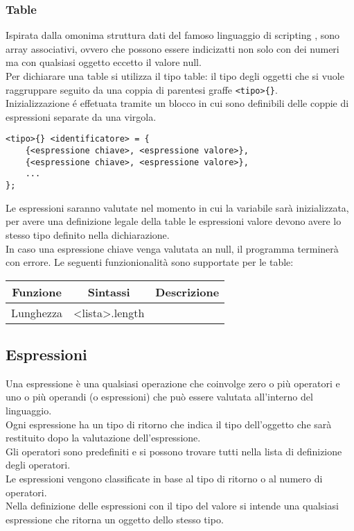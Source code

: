 \subsubsection{Table}
Ispirata dalla omonima struttura dati del famoso linguaggio di scripting \cite{LUA},
sono array associativi, ovvero che possono essere indicizatti non solo con dei 
numeri ma con qualsiasi oggetto eccetto il valore null. \\
Per dichiarare una table si utilizza il tipo table:
il tipo degli oggetti che si vuole raggruppare seguito da una coppia di parentesi 
graffe \verb|<tipo>{}|. \\
Inizializzazione é effetuata tramite un blocco in cui sono definibili delle coppie
di espressioni separate da una virgola.
\begin{lstlisting}
<tipo>{} <identificatore> = {
    {<espressione chiave>, <espressione valore>},
    {<espressione chiave>, <espressione valore>},
    ...
};
\end{lstlisting}
Le espressioni saranno valutate nel momento in cui la variabile sarà inizializzata,
per avere una definizione legale della table le espressioni valore devono avere 
lo stesso tipo definito nella dichiarazione. \\
In caso una espressione chiave venga valutata an null, il programma terminerà con errore.
Le seguenti funzionionalità sono supportate per le table: \\
\begin{center}
\begin{tabular}{| c | c | c |}
    \hline 
    Funzione & Sintassi & Descrizione \\
    \hline 
    Lunghezza & <lista>.length & 
    
\end{tabular}
\end{center}

\newpage
\subsection{Espressioni}
Una espressione è una qualsiasi operazione che coinvolge zero o più operatori e uno o più operandi 
(o espressioni) che può essere valutata all’interno del linguaggio. \\
Ogni espressione ha un tipo di ritorno che indica il tipo dell’oggetto che sarà restituito dopo la valutazione 
dell’espressione. \\
Gli operatori sono predefiniti e si possono trovare tutti nella lista di definizione degli operatori. \\
Le espressioni vengono classificate in base al tipo di ritorno o al numero di operatori.
\\
Nella definizione delle espressioni con il tipo del valore si intende una qualsiasi espressione che ritorna 
un oggetto dello stesso tipo.

